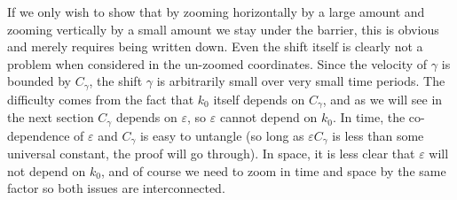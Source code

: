 \documentclass[11pt]{amsart}
\theoremstyle{remark}
\theoremstyle{definition}
\newcommand{\eps}{\varepsilon}
\begin{document}
If we only wish to show that by zooming horizontally by a large amount and zooming vertically by a small amount we stay under the barrier, this is obvious and merely requires being written down.  Even the shift itself is clearly not a problem when considered in the un-zoomed coordinates.  Since the velocity of $\gamma$ is bounded by $C_\gamma$, the shift $\gamma$ is arbitrarily small over very small time periods.  The difficulty comes from the fact that $k_0$ itself depends on $C_\gamma$, and as we will see in the next section $C_\gamma$ depends on $\eps$, so $\eps$ cannot depend on $k_0$.  In time, the co-dependence of $\eps$ and $C_\gamma$ is easy to untangle (so long as $\eps C_\gamma$ is less than some universal constant, the proof will go through).  In space, it is less clear that $\eps$ will not depend on $k_0$, and of course we need to zoom in time and space by the same factor so both issues are interconnected.  
\end{document}
